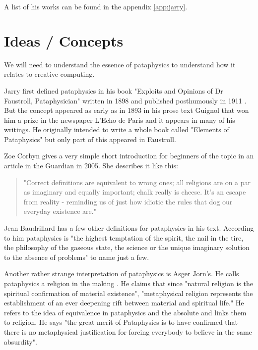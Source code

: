 A list of his works can be found in the appendix \ref{app:jarry}.


\section{Ideas / Concepts}

We will need to understand the essence of pataphysics to understand how it relates to creative computing.

Jarry first defined pataphysics in his book "Exploits and Opinions of Dr Faustroll, Pataphysician" written in 1898 and published posthumously in 1911 \citep{Jarry1996}. But the concept appeared as early as in 1893 in his prose text Guignol that won him a prize in the newspaper L'Echo de Paris and it appears in many of his writings. He originally intended to write a whole book called "Elements of Pataphysics" but only part of this appeared in Faustroll.

Zoe Corbyn gives a very simple short introduction for beginners of the topic in an article in the Guardian \citep{Corbyn2005} in 2005. She describes it like this:

\begin{quote}
  "Correct definitions are equivalent to wrong ones; all religions are on a par as imaginary and equally important; chalk really is cheese. It's an escape from reality - reminding us of just how idiotic the rules that dog our everyday existence are." \citep{Jarry1996}
\end{quote}

Jean Baudrillard has a few other definitions for pataphysics in his text\citep{Baudrillard2007}. According to him pataphysics is "the highest temptation of the spirit, the nail in the tire, the philosophy of the gaseous state, the science or the unique imaginary solution to the absence of problems" to name just a few.

Another rather strange interpretation of pataphysics is Asger Jorn's. He calls pataphysics a religion in the making \citep{Jorn1961}. He claims that since "natural religion is the spiritual confirmation of material existence", "metaphysical religion represents the establishment of an ever deepening rift between material and spiritual life." He refers to the idea of equivalence in pataphysics and the absolute and links them to religion. He says "the great merit of Pataphysics is to have confirmed that there is no metaphysical justification for forcing everybody to believe in the same absurdity".

